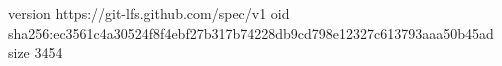 version https://git-lfs.github.com/spec/v1
oid sha256:ec3561c4a30524f8f4ebf27b317b74228db9cd798e12327c613793aaa50b45ad
size 3454
